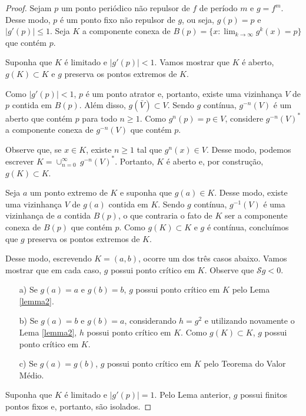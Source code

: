 \begin{proof}
Sejam $p$ um ponto periódico não repulsor de $f$ de período $m$ e $g = f^m$. Desse modo, $p$ é um ponto fixo não repulsor de $g$, ou seja, $g(p) = p$ e $|g'(p)| \leq 1$. Seja $K$ a componente conexa de $B(p) = \{ x : \lim_{k \to \infty} g^k(x) = p \}$ que contém $p$.

Suponha que $K$ é limitado e $|g'(p)| < 1$. Vamos mostrar que $K$ é aberto, $g(K) \subset K$ e $g$ preserva os pontos extremos de $K$.

Como $|g'(p)| < 1$, $p$ é um ponto atrator e, portanto, existe uma vizinhança $V$ de $p$ contida em $B(p)$. Além disso, $g(\bar{V}) \subset V$. Sendo $g$ contínua, $g^{-n}(V)$ é um aberto que contém $p$ para todo $n \geq 1$. Como $g^n(p) = p \in V$, considere $g^{-n}(V)^*$ a componente conexa de $g^{-n}(V)$ que contém $p$.

Observe que, se $x \in K$, existe $n \geq 1$ tal que $g^n(x) \in V$. Desse modo, podemos escrever $K = \cup^{\infty}_{n = 0} \ g^{-n}(V)^*$. Portanto, $K$ é aberto e, por construção, $g(K) \subset K$.

Seja $a$ um ponto extremo de $K$ e suponha que $g(a) \in K$. Desse modo, existe uma vizinhança $V$ de $g(a)$ contida em $K$. Sendo $g$ contínua, $g^{-1}(V)$ é uma vizinhança de $a$ contida $B(p)$, o que contraria o fato de $K$ ser a componente conexa de $B(p)$ que contém $p$. Como $g(K) \subset K$ e $g$ é contínua, concluímos que $g$ preserva os pontos extremos de $K$.

Desse modo, escrevendo $K = (a, b)$, ocorre um dos três casos abaixo. Vamos mostrar que em cada caso, $g$ possui ponto crítico em $K$. Observe que $\mathcal{S}g < 0$.

\begin{enumerate}

\item[a)] Se $g(a) = a$ e $g(b) = b$, $g$ possui ponto crítico em $K$ pelo Lema \ref{lemma2}.
\item[b)] Se $g(a) = b$ e $g(b) = a$,  considerando $h = g^2$ e utilizando novamente o Lema \ref{lemma2}, $h$ possui ponto crítico em $K$. Como $g(K) \subset K$, $g$ possui ponto crítico em $K$.
\item[c)] Se $g(a) = g(b)$, $g$ possui ponto crítico em $K$ pelo Teorema do Valor Médio.
\end{enumerate}

Suponha que $K$ é limitado e $|g'(p)| = 1$. Pelo Lema anterior, $g$ possui finitos pontos fixos e, portanto, são isolados.


\end{proof}
